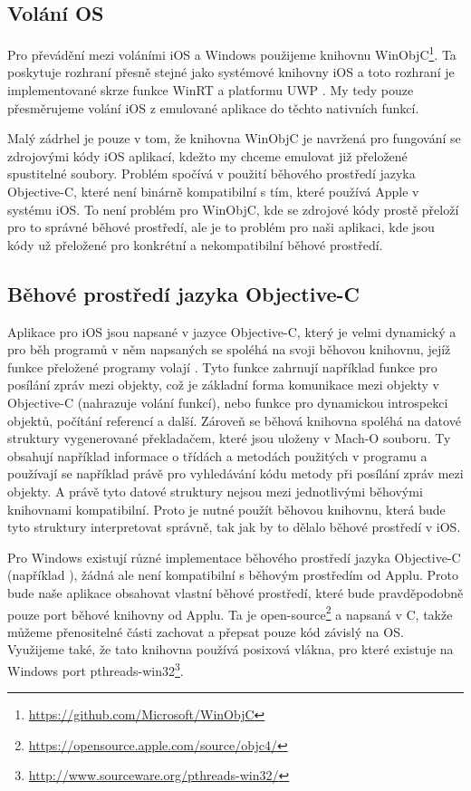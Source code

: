 \documentclass[12pt]{article}
\newcommand{\Rplus}{\protect\hspace{-.1em}\protect\raisebox{.35ex}{\smaller{\smaller\textbf{+}}}}
\newcommand{\Cpp}{\mbox{C\Rplus\Rplus}\xspace}
\begin{document}
\subsection*{Volání OS}
\label{sec:winobjc}

Pro převádění mezi voláními iOS a Windows použijeme knihovnu WinObjC\footnote{\url{https://github.com/Microsoft/WinObjC}}.
Ta poskytuje rozhraní přesně stejné jako systémové knihovny iOS a toto rozhraní je implementované skrze funkce WinRT a platformu UWP \cite{winobjc}.
My tedy pouze přesměrujeme volání iOS z emulované aplikace do těchto nativních funkcí.

Malý zádrhel je pouze v tom, že knihovna WinObjC je navržená pro fungování se zdrojovými kódy iOS aplikací, kdežto my chceme emulovat již přeložené spustitelné soubory.
Problém spočívá v použití běhového prostředí jazyka Objective-C, které není binárně kompatibilní s tím, které používá Apple v systému iOS.
To není problém pro WinObjC, kde se zdrojové kódy prostě přeloží pro to správné běhové prostředí, ale je to problém pro naši aplikaci, kde jsou kódy už přeložené pro konkrétní a nekompatibilní běhové prostředí.

\subsection*{Běhové prostředí jazyka Objective-C}

Aplikace pro iOS jsou napsané v jazyce Objective-C, který je velmi dynamický a pro běh programů v něm napsaných se spoléhá na svoji běhovou knihovnu, jejíž funkce přeložené programy volají \cite{objc, understandingObjc}.
Tyto funkce zahrnují například funkce pro posílání zpráv mezi objekty, což je základní forma komunikace mezi objekty v Objective-C (nahrazuje volání funkcí), nebo funkce pro dynamickou introspekci objektů, počítání referencí a další.
Zároveň se běhová knihovna spoléhá na datové struktury vygenerované překladačem, které jsou uloženy v Mach-O souboru.
Ty obsahují například informace o třídách a metodách použitých v programu a používají se například právě pro vyhledávání kódu metody při posílání zpráv mezi objekty.
A právě tyto datové struktury nejsou mezi jednotlivými běhovými knihovnami kompatibilní.
Proto je nutné použít běhovou knihovnu, která bude tyto struktury interpretovat správně, tak jak by to dělalo běhové prostředí v iOS.

Pro Windows existují různé implementace běhového prostředí jazyka Objective-C (například \cite{modernObjc, gnustep}), žádná ale není kompatibilní s běhovým prostředím od Applu.
Proto bude naše aplikace obsahovat vlastní běhové prostředí, které bude pravděpodobně pouze port běhové knihovny od Applu.
Ta je open-source\footnote{\url{https://opensource.apple.com/source/objc4/}} a napsaná v \Cpp, takže můžeme přenositelné části zachovat a přepsat pouze kód závislý na OS.
Využijeme také, že tato knihovna používá posixová vlákna, pro které existuje na Windows port pthreads-win32\footnote{\url{http://www.sourceware.org/pthreads-win32/}}.



\end{document}
